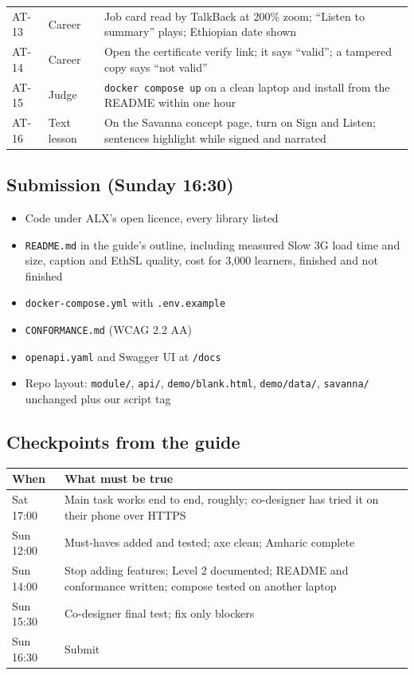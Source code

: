 \documentclass[11pt,a4paper]{article}
\newcommand{\code}[1]{\texttt{#1}}
\begin{document}
\begin{xltabular}{\textwidth}{@{}l >{\raggedright\arraybackslash}p{2.6cm} X@{}}
AT-13 & Career & Job card read by TalkBack at 200\% zoom; ``Listen to summary'' plays; Ethiopian date shown \\
AT-14 & Career & Open the certificate verify link; it says ``valid''; a tampered copy says ``not valid'' \\
AT-15 & Judge & \code{docker compose up} on a clean laptop and install from the README within one hour \\
AT-16 & Text lesson & On the Savanna concept page, turn on Sign and Listen; sentences highlight while signed and narrated \\
\bottomrule
\end{xltabular}

\subsection{Submission (Sunday 16:30)}
\begin{itemize}[label=$\square$]
  \item Code under ALX's open licence, every library listed
  \item \code{README.md} in the guide's outline, including measured Slow 3G load time and size, caption and EthSL quality, cost for 3,000 learners, finished and not finished
  \item \code{docker-compose.yml} with \code{.env.example}
  \item \code{CONFORMANCE.md} (WCAG 2.2 AA)
  \item \code{openapi.yaml} and Swagger UI at \code{/docs}
  \item Repo layout: \code{module/}, \code{api/}, \code{demo/blank.html}, \code{demo/data/}, \code{savanna/} unchanged plus our script tag
\end{itemize}

\subsection{Checkpoints from the guide}
\begin{xltabular}{\textwidth}{@{}l X@{}}
\toprule
\textbf{When} & \textbf{What must be true} \\
\midrule
\endhead
Sat 17:00 & Main task works end to end, roughly; co-designer has tried it on their phone over HTTPS \\
Sun 12:00 & Must-haves added and tested; axe clean; Amharic complete \\
Sun 14:00 & Stop adding features; Level 2 documented; README and conformance written; compose tested on another laptop \\
Sun 15:30 & Co-designer final test; fix only blockers \\
Sun 16:30 & Submit \\
\bottomrule
\end{xltabular}
\end{document}
